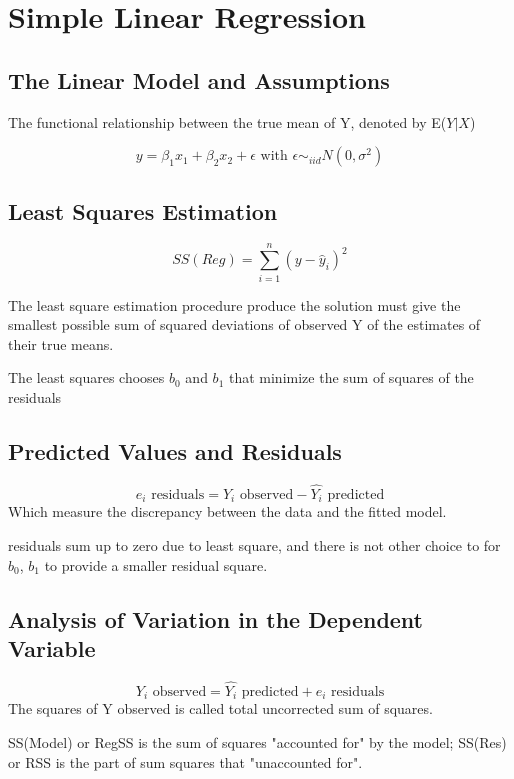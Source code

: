 \documentclass[12pt]{article}
\begin{document}
\section{Simple Linear Regression}
\subsection{The Linear Model and Assumptions}

The functional relationship between the true mean of Y, denoted by E($Y|X$)

$$y=\beta_1 x_1+\beta_2 x_2+\epsilon \textrm{  with  } \epsilon \sim_{iid} N(0,\sigma^2)$$

\subsection{Least Squares Estimation}

$$SS(Reg) = \sum^{n}_{i=1} (y - \hat{y}_i)^2 $$

The least square estimation procedure produce the solution must give the smallest possible sum
of squared deviations of observed Y of the estimates of their true means.

The least squares chooses $b_0$ and $b_1$ that minimize the sum of squares of the residuals

\subsection{Predicted Values and Residuals}

$$e_i \textrm{ residuals} = Y_i \textrm{ observed} - \hat{Y_i} \textrm{ predicted}$$
Which measure the discrepancy between the data and the fitted model.

residuals sum up to zero due to least square, and there is not other choice to for $b_0$, $b_1$ to
provide a smaller residual square.

\subsection{Analysis of Variation in the Dependent Variable}

$$ Y_i \textrm{ observed} = \hat{Y_i} \textrm{ predicted} + e_i \textrm{ residuals}$$
The squares of Y observed is called total uncorrected sum of squares.

SS(Model) or RegSS is the sum of squares "accounted for" by the model;
SS(Res) or RSS is the part of sum squares that "unaccounted for".
\end{document}
